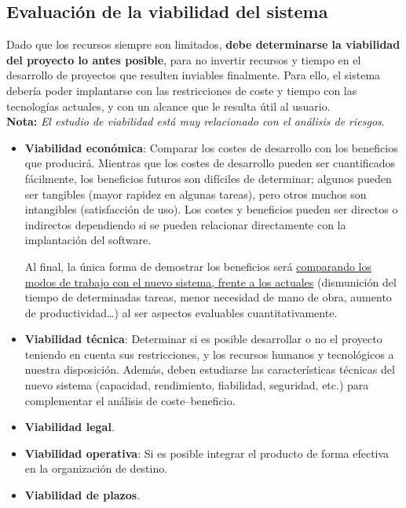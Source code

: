 \subsection{Evaluación de la viabilidad del sistema}

Dado que los recursos siempre son limitados, \textbf{debe determinarse la viabilidad del proyecto lo antes posible}, para no invertir recursos y tiempo en el desarrollo de proyectos que resulten inviables finalmente. Para ello, el sistema debería poder implantarse con las restricciones de coste y tiempo con las tecnologías actuales, y con un alcance que le resulta útil al usuario.\\

\textbf{Nota:} \textit{El estudio de viabilidad está muy relacionado con el análisis de riesgos}.

\begin{itemize}
    \item \textbf{Viabilidad económica}: Comparar los costes de desarrollo con los beneficios que producirá. Mientras que los costes de desarrollo pueden ser cuantificados fácilmente, los beneficios futuros son difíciles de determinar; algunos pueden ser tangibles (mayor rapidez en algunas tareas), pero otros muchos son intangibles (satisfacción de uso). Los costes y beneficios pueden ser directos o indirectos dependiendo si se pueden relacionar directamente con la implantación del software.
    
    Al final, la única forma de demostrar los beneficios será \uline{comparando los modos de trabajo con el nuevo sistema, frente a los actuales} (dismunición del tiempo de determinadas tareas, menor necesidad de mano de obra, aumento de productividad\ldots) al ser aspectos evaluables cuantitativamente.
    \item \textbf{Viabilidad técnica}: Determinar si es posible desarrollar o no el proyecto teniendo en cuenta sus restricciones, y los recursos humanos y tecnológicos a nuestra disposición. Además, deben estudiarse las características técnicas del nuevo sistema (capacidad, rendimiento, fiabilidad, seguridad, etc.) para complementar el análisis de coste--beneficio. 
    \item \textbf{Viabilidad legal}.
    \item \textbf{Viabilidad operativa}: Si es posible integrar el producto de forma efectiva en la organización de destino.
    \item \textbf{Viabilidad de plazos}.
\end{itemize}

